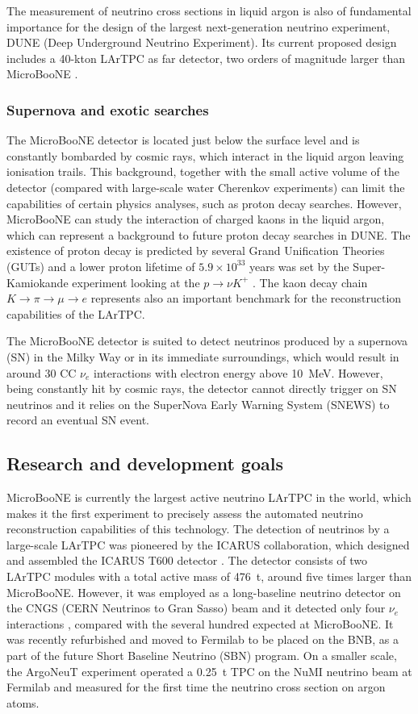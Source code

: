 The measurement of neutrino cross sections in liquid argon is also of fundamental importance for the design of the largest next-generation neutrino experiment, DUNE (Deep Underground Neutrino Experiment). Its current proposed design includes a 40-kton LArTPC as far detector, two orders of magnitude larger than MicroBooNE \cite{Acciarri:2016ooe}.

\subsubsection{Supernova and exotic searches}
The MicroBooNE detector is located just below the surface level and is constantly bombarded by cosmic rays, which interact in the liquid argon leaving ionisation trails. This background, together with the small active volume of the detector (compared with large-scale water Cherenkov experiments) can limit the capabilities of certain physics analyses, such as proton decay searches. However, MicroBooNE can study the interaction of charged kaons in the liquid argon, which can represent a background to future proton decay searches in DUNE.
The existence of proton decay is predicted by several Grand Unification Theories (GUTs) and a lower proton lifetime of $5.9\times10^{33}$ years was set by the Super-Kamiokande experiment looking at the $p\rightarrow \nu K^+$ \cite{Abe:2014mwa}. The kaon decay chain $K\rightarrow\pi\rightarrow\mu\rightarrow e$ represents also an important benchmark for the reconstruction capabilities of the LArTPC.

The MicroBooNE detector is suited to detect neutrinos produced by a supernova (SN) in the Milky Way or in its immediate surroundings, which would result in around 30 CC $\nu_e$ interactions with electron energy above 10~MeV. However, being constantly hit by cosmic rays, the detector cannot directly trigger on SN neutrinos and it relies on the SuperNova Early Warning System (SNEWS) \cite{Antonioli:2004zb} to record an eventual SN event. 


\subsection{Research and development goals}
MicroBooNE is currently the largest active neutrino LArTPC in the world, which makes it the first experiment to precisely assess the automated neutrino reconstruction capabilities of this technology. The detection of neutrinos by a large-scale LArTPC was pioneered by the ICARUS collaboration, which designed and assembled the ICARUS T600 detector \cite{Amerio:2004ze}. The detector consists of two LArTPC modules with a total active mass of 476~t, around five times larger than MicroBooNE. However, it was employed as a long-baseline neutrino detector on the CNGS (CERN Neutrinos to Gran Sasso) beam and it detected only four $\nu_e$ interactions \cite{Antonello:2013gut}, compared with the several hundred expected at MicroBooNE. It was recently refurbished and moved to Fermilab to be placed on the BNB, as a part of the future Short Baseline Neutrino (SBN) program. On a smaller scale, the ArgoNeuT experiment operated a 0.25~t TPC on the NuMI neutrino beam at Fermilab \cite{Anderson:2012vc} and measured for the first time the neutrino cross section on argon atoms.


